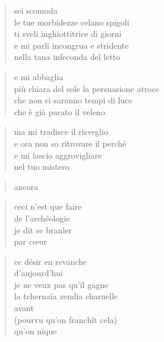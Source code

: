	\begin{verse}
		sei scomoda\\
		le tue morbidezze celano spigoli\\
		ti sveli inghiottitrice di giorni\\
		e mi parli incongrua e stridente\\
		nella tana infeconda del letto
	\end{verse}

	\begin{verse}
		e mi abbaglia\\
		più chiara del sole la persuasione atroce\\
		che non ci saranno tempi di luce\\
		che è già parato il veleno
	\end{verse}

	\begin{verse}
		ma mi tradisce il risveglio\\
		e ora non so ritrovare il perché\\
		e mi lascio aggrovigliare\\
		nel tuo mistero
	\end{verse}

	\begin{verse}
		ancora
	\end{verse}

\clearpage


\vspace*{2cm}

	\begin{otherlanguage}{french}
		\begin{verse}
			ceci n'est que faire\\
			de l'archéologie\\
			je dit se branler\\
			par cœur
		\end{verse}

		\begin{verse}
			ce désir en revanche\\
			d'aujourd'hui\\
			je ne veux pas qu'il gagne\\
			la tchernaïa zemlia charnelle\\
			avant\\
			(pourvu qu'on franchît cela)\\
			qu'on nique
		\end{verse}
	\end{otherlanguage}

